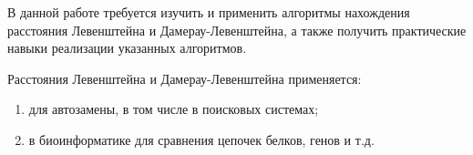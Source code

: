 \Introduction
    В данной работе требуется изучить и применить алгоритмы нахождения 
    расстояния Левенштейна и Дамерау-Левенштейна, а также получить
    практические навыки реализации указанных алгоритмов.
    
    Расстояния Левенштейна и Дамерау-Левенштейна применяется: \begin{enumerate}
        \item для автозамены, в том числе в поисковых системах;
        \item в биоинформатике для сравнения цепочек белков, генов и т.д.
    \end{enumerate}
\newpage